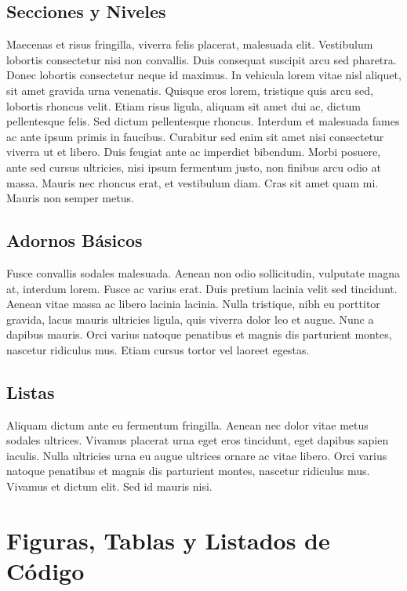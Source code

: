 \documentclass{article}
\begin{document}
\subsection{Secciones y Niveles}

Maecenas et risus fringilla, viverra felis placerat, malesuada elit. Vestibulum lobortis consectetur nisi non convallis. Duis consequat suscipit arcu sed pharetra. Donec lobortis consectetur neque id maximus. In vehicula lorem vitae nisl aliquet, sit amet gravida urna venenatis. Quisque eros lorem, tristique quis arcu sed, lobortis rhoncus velit. Etiam risus ligula, aliquam sit amet dui ac, dictum pellentesque felis. Sed dictum pellentesque rhoncus. Interdum et malesuada fames ac ante ipsum primis in faucibus. Curabitur sed enim sit amet nisi consectetur viverra ut et libero. Duis feugiat ante ac imperdiet bibendum. Morbi posuere, ante sed cursus ultricies, nisi ipsum fermentum justo, non finibus arcu odio at massa. Mauris nec rhoncus erat, et vestibulum diam. Cras sit amet quam mi. Mauris non semper metus.

\subsection{Adornos Básicos}

Fusce convallis sodales malesuada. Aenean non odio sollicitudin, vulputate magna at, interdum lorem. Fusce ac varius erat. Duis pretium lacinia velit sed tincidunt. Aenean vitae massa ac libero lacinia lacinia. Nulla tristique, nibh eu porttitor gravida, lacus mauris ultricies ligula, quis viverra dolor leo et augue. Nunc a dapibus mauris. Orci varius natoque penatibus et magnis dis parturient montes, nascetur ridiculus mus. Etiam cursus tortor vel laoreet egestas.

\subsection{Listas}

Aliquam dictum ante eu fermentum fringilla. Aenean nec dolor vitae metus sodales ultrices. Vivamus placerat urna eget eros tincidunt, eget dapibus sapien iaculis. Nulla ultricies urna eu augue ultrices ornare ac vitae libero. Orci varius natoque penatibus et magnis dis parturient montes, nascetur ridiculus mus. Vivamus et dictum elit. Sed id mauris nisi.

\section{Figuras, Tablas y Listados de Código}
\end{document}

